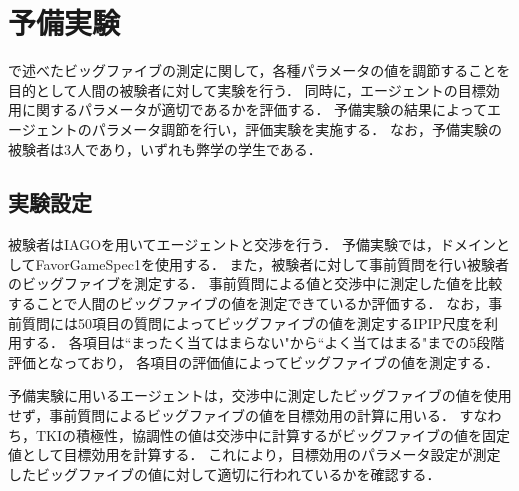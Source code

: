 

\chapter{予備実験}
で述べたビッグファイブの測定に関して，各種パラメータの値を調節することを目的として人間の被験者に対して実験を行う．
同時に，エージェントの目標効用に関するパラメータが適切であるかを評価する．
予備実験の結果によってエージェントのパラメータ調節を行い，評価実験を実施する．
なお，予備実験の被験者は3人であり，いずれも弊学の学生である．

\section{実験設定}
被験者はIAGOを用いてエージェントと交渉を行う．
予備実験では，ドメインとしてFavorGameSpec1を使用する．
また，被験者に対して事前質問を行い被験者のビッグファイブを測定する．
事前質問による値と交渉中に測定した値を比較することで人間のビッグファイブの値を測定できているか評価する．
なお，事前質問には50項目の質問によってビッグファイブの値を測定するIPIP尺度を利用する．
各項目は“まったく当てはまらない"から“よく当てはまる"までの5段階評価となっており，
各項目の評価値によってビッグファイブの値を測定する．

予備実験に用いるエージェントは，交渉中に測定したビッグファイブの値を使用せず，事前質問によるビッグファイブの値を目標効用の計算に用いる．
すなわち，TKIの積極性，協調性の値は交渉中に計算するがビッグファイブの値を固定値として目標効用を計算する．
これにより，目標効用のパラメータ設定が測定したビッグファイブの値に対して適切に行われているかを確認する．

